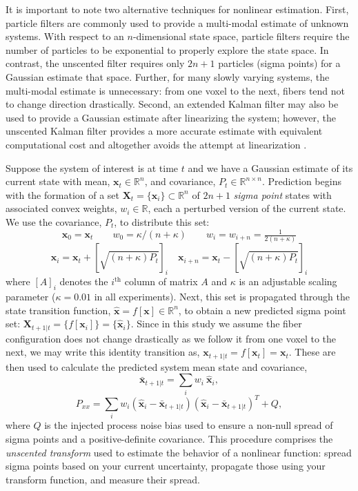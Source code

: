 \documentclass[letterpaper,hyperref,12pt]{gatech-thesis}
\renewcommand{\v}[1]{\ensuremath{\mathbf #1}\xspace}
\newcommand{\R}{\ensuremath{\mathbb R}}
\newcommand{\x}{\v x}
\newcommand{\X}{\v X}
\begin{document}
It is important to note two alternative techniques for nonlinear estimation.
%
First, particle filters are commonly used to provide a multi-modal estimate of
unknown systems.  With respect to an $n$-dimensional state space, particle
filters require the number of particles to be exponential to properly explore
the state space.  In contrast, the unscented filter requires only $2n+1$
particles (sigma points) for a Gaussian estimate that space.  Further, for
many slowly varying systems, the multi-modal estimate is unnecessary:  from
one voxel to the next, fibers tend not to change direction drastically.
%
Second, an extended Kalman filter may also be used to provide a Gaussian
estimate after linearizing the system; however, the unscented Kalman filter
provides a more accurate estimate with equivalent computational cost and
altogether avoids the attempt at linearization
\cite{Julier2004,Merwe2003,Lefebvre2004}.


Suppose the system of interest is at time $t$ and we have a Gaussian estimate
of its current state with mean, $\x_t \in \R^n$, and covariance, $P_t \in
\R^{n \times n}$.  Prediction begins with the formation of a set
$\X_t=\{\x_i\} \subset \R^n$ of $2n+1$ \textit{sigma point} states with
associated convex weights, $w_i \in \R$, each a perturbed version of the
current state.  We use the covariance, $P_t$, to distribute this set:
\begin{equation*}
  \x_0 = \x_t
  \qquad
  w_0 = \kappa/(n+\kappa)
  \qquad
  w_i = w_{i+n} = \tfrac{1}{2(n+\kappa)}
\end{equation*}
\begin{equation}   \label{eq:sigma_points}
  \x_{i}   = \x_t + \left[\sqrt{(n+\kappa)P_t}\right]_i
  \quad
  \x_{i+n} = \x_t - \left[\sqrt{(n+\kappa)P_t}\right]_i
\end{equation}
where $[A]_i$ denotes the $i^\text{th}$ column of matrix $A$ and $\kappa$ is
an adjustable scaling parameter ($\kappa = 0.01$ in all experiments).  Next,
this set is propagated through the state transition function, $\hat{\x}=f[\x]
\in \R^n$, to obtain a new predicted sigma point set:
$\X_{t+1|t}=\{f[\x_i]\}=\{\hat{\x}_i\}$.  Since in this study we assume the
fiber configuration does not change drastically as we follow it from one voxel
to the next, we may write this identity transition as, $\x_{t+1|t} = f[\x_t] =
\x_t $.  These are then used to calculate the predicted system mean state and
covariance,
\begin{equation*}
  \bar{\x}_{t+1|t} = \sum_i w_i ~ \hat{\x}_i ,
\end{equation*}
\begin{equation} \label{eq:Pxx}
  P_{xx} = \sum_i w_i \left(\hat{\x}_i - \bar{\x}_{t+1|t}\right)
                     \left(\hat{\x}_i - \bar{\x}_{t+1|t}\right)^T
           + Q ,
\end{equation}
where $Q$ is the injected process noise bias used to ensure a non-null spread
of sigma points and a positive-definite covariance.  This procedure comprises
the \textit{unscented transform} used to estimate the behavior of a nonlinear
function: spread sigma points based on your current uncertainty, propagate
those using your transform function, and measure their spread.
\end{document}
